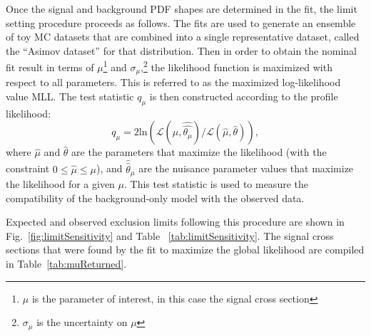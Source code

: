 Once the signal and background PDF shapes are determined in the fit,
the limit setting procedure proceeds as follows.  The fits are used to generate
an ensemble of toy MC datasets
that are combined into a single representative dataset, called the ``Asimov
dataset'' for that distribution.  Then 
in order to obtain the nominal fit result in terms of $\mu$\footnote{$\mu$ is the 
parameter of interest, in this case the signal cross section} and $\sigma_{\mu}$,\footnote{$\sigma_{\mu}$
is the uncertainty on $\mu$}
the likelihood function is maximized with respect to all parameters.
This is referred to as the maximized log-likelihood value MLL.
The test statistic $q_\mu$ is then constructed according to
the profile likelihood:
\begin{equation}
q_\mu = 2 \mathrm{ln} (\mathcal{L} (\mu,
\hat{\hat{\theta_\mu}})/\mathcal{L} (\hat{\mu}, \hat{\theta})), 
\end{equation}
where
$\hat{\mu}$ and $\hat{\theta}$ are the parameters that maximize the
likelihood (with the constraint $0 \leq \hat{\mu} \leq \mu$), and
$\hat{\hat{\theta}}_\mu$ are the nuisance parameter values that maximize the
likelihood for a given $\mu$. This test statistic is used to measure
the compatibility of the background-only model with the observed
data. 

Expected and observed exclusion limits following this procedure are shown in Fig.~\ref{fig:limitSensitivity} and Table
~\ref{tab:limitSensitivity}. The signal cross sections that were found by the fit to maximize
the global likelihood are compiled in Table~\ref{tab:muReturned}.




